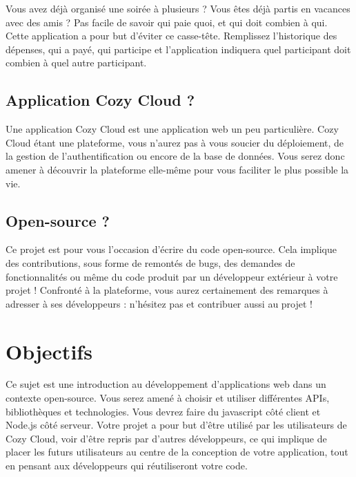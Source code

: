 \documentclass{42-fr}
\begin{document}
		Vous avez d\'ej\`a organisé une soir\'ee \`a plusieurs ? Vous \^etes d\'ej\`a partis en
		vacances avec des amis ? Pas facile de savoir qui paie quoi, et qui doit
		combien \`a qui. Cette application a pour but d'\'eviter ce casse-t\^ete. Remplissez
		l'historique des d\'epenses, qui a pay\'e, qui participe et l'application
		indiquera quel participant doit combien \`a quel autre participant.

	\section{Application Cozy Cloud ?}

		Une application Cozy Cloud est une application web un peu particuli\`ere.
		Cozy Cloud \'etant une plateforme, vous n'aurez pas \`a vous soucier du
		d\'eploiement, de la gestion de l'authentification ou encore de la base de
		donn\'ees. Vous serez donc amener \`a d\'ecouvrir la plateforme elle-m\^eme pour
		vous faciliter le plus possible la vie.


	\section{Open-source ?}

		Ce projet est pour vous l'occasion d'\'ecrire du code open-source.
		Cela implique des contributions, sous forme de remont\'es de bugs, des
		demandes de fonctionnalit\'es ou m\^eme du code produit par un d\'eveloppeur
		ext\'erieur \`a votre projet !
		Confront\'e \`a la plateforme, vous aurez certainement des remarques \`a
		adresser \`a ses d\'eveloppeurs : n'h\'esitez pas et contribuer aussi au projet !



\chapter{Objectifs}


	Ce sujet est une introduction au d\'eveloppement d'applications web dans un contexte
	open-source. Vous serez amen\'e \`a choisir et utiliser diff\'erentes APIs,
	biblioth\`eques et technologies. Vous devrez faire du javascript c\^ot\'e
	client et Node.js c\^ot\'e serveur. Votre projet a pour but d'\^etre utilis\'e
	par les utilisateurs de Cozy Cloud, voir d'\^etre repris par d'autres
	d\'eveloppeurs, ce qui implique de placer les futurs utilisateurs au centre
	de la conception de votre application, tout en pensant aux d\'eveloppeurs qui
	r\'eutiliseront votre code.
\end{document}
